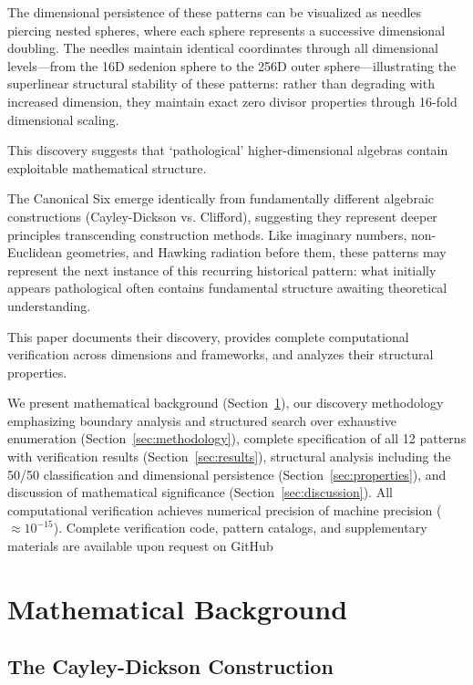 \documentclass[11pt]{article}
\begin{document}
The dimensional persistence of these patterns can be visualized as needles piercing nested spheres, where each sphere represents a successive dimensional doubling. The needles maintain identical coordinates through all dimensional levels---from the 16D sedenion sphere to the 256D outer sphere---illustrating the superlinear structural stability of these patterns: rather than degrading with increased dimension, they maintain exact zero divisor properties through 16-fold dimensional scaling.

This discovery suggests that `pathological' higher-dimensional algebras contain exploitable mathematical structure.

The Canonical Six emerge identically from fundamentally different algebraic constructions (Cayley-Dickson vs. Clifford), suggesting they represent deeper principles transcending construction methods. Like imaginary numbers, non-Euclidean geometries, and Hawking radiation before them, these patterns may represent the next instance of this recurring historical pattern: what initially appears pathological often contains fundamental structure awaiting theoretical understanding.

This paper documents their discovery, provides complete computational verification across dimensions and frameworks, and analyzes their structural properties.

We present mathematical background (Section~\ref{sec:background}), our discovery methodology emphasizing boundary analysis and structured search over exhaustive enumeration (Section~\ref{sec:methodology}), complete specification of all 12 patterns with verification results (Section~\ref{sec:results}), structural analysis including the 50/50 classification and dimensional persistence (Section~\ref{sec:properties}), and discussion of mathematical significance (Section~\ref{sec:discussion}). All computational verification achieves numerical precision of machine precision ($\approx 10^{-15}$). Complete verification code, pattern catalogs, and supplementary materials are available upon request on GitHub
\section{Mathematical Background}
\label{sec:background}

\subsection{The Cayley-Dickson Construction}
\end{document}
